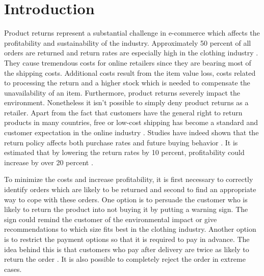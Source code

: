 \documentclass[12pt]{article}
\begin{document}
\section{Introduction}
Product returns represent a substantial challenge in e-commerce which affects the profitability and sustainability of the industry. Approximately 50 percent of all orders are returned and return rates are especially high in the clothing industry \cite{asdecker2015returning}. They cause tremendous costs for online retailers since they are bearing most of the shipping costs. Additional costs result from the item value loss, costs related to processing the return and a higher stock which is needed to compensate the unavailability of an item. Furthermore, product returns severely impact the environment. Nonetheless it isn’t possible to simply deny product returns as a retailer. Apart from the fact that customers have the general right to return products in many countries, free or low-cost shipping has become a standard and customer expectation in the online industry \cite{urbanke2015predicting}. Studies have indeed shown that the return policy affects both purchase rates \cite{wood2001remote} and future buying behavior \cite{petersen2009product}. It is estimated that by lowering the return rates by 10 percent, profitability could increase by over 20 percent \cite{pur2013retourenmanagement}. 


To minimize the costs and increase profitability, it is first necessary to correctly identify orders which are likely to be returned and second to find an appropriate way to cope with these orders. One option is to persuade the customer who is likely to return the product into not buying it by putting a warning sign. The sign could remind the customer of the environmental impact or give recommendations to which size fits best in the clothing industry. Another option is to restrict the payment options so that it is required to pay in advance. The idea behind this is that customers who pay after delivery are twice as likely to return the order \cite{asdecker2015returning}. It is also possible to completely reject the order in extreme cases.
\end{document}
